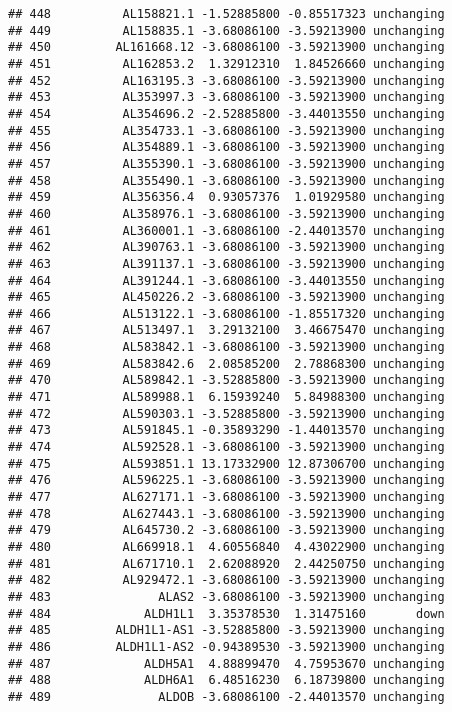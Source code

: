\documentclass[]{article}
\begin{document}
\begin{verbatim}
## 448          AL158821.1 -1.52885800 -0.85517323 unchanging
## 449          AL158835.1 -3.68086100 -3.59213900 unchanging
## 450         AL161668.12 -3.68086100 -3.59213900 unchanging
## 451          AL162853.2  1.32912310  1.84526660 unchanging
## 452          AL163195.3 -3.68086100 -3.59213900 unchanging
## 453          AL353997.3 -3.68086100 -3.59213900 unchanging
## 454          AL354696.2 -2.52885800 -3.44013550 unchanging
## 455          AL354733.1 -3.68086100 -3.59213900 unchanging
## 456          AL354889.1 -3.68086100 -3.59213900 unchanging
## 457          AL355390.1 -3.68086100 -3.59213900 unchanging
## 458          AL355490.1 -3.68086100 -3.59213900 unchanging
## 459          AL356356.4  0.93057376  1.01929580 unchanging
## 460          AL358976.1 -3.68086100 -3.59213900 unchanging
## 461          AL360001.1 -3.68086100 -2.44013570 unchanging
## 462          AL390763.1 -3.68086100 -3.59213900 unchanging
## 463          AL391137.1 -3.68086100 -3.59213900 unchanging
## 464          AL391244.1 -3.68086100 -3.44013550 unchanging
## 465          AL450226.2 -3.68086100 -3.59213900 unchanging
## 466          AL513122.1 -3.68086100 -1.85517320 unchanging
## 467          AL513497.1  3.29132100  3.46675470 unchanging
## 468          AL583842.1 -3.68086100 -3.59213900 unchanging
## 469          AL583842.6  2.08585200  2.78868300 unchanging
## 470          AL589842.1 -3.52885800 -3.59213900 unchanging
## 471          AL589988.1  6.15939240  5.84988300 unchanging
## 472          AL590303.1 -3.52885800 -3.59213900 unchanging
## 473          AL591845.1 -0.35893290 -1.44013570 unchanging
## 474          AL592528.1 -3.68086100 -3.59213900 unchanging
## 475          AL593851.1 13.17332900 12.87306700 unchanging
## 476          AL596225.1 -3.68086100 -3.59213900 unchanging
## 477          AL627171.1 -3.68086100 -3.59213900 unchanging
## 478          AL627443.1 -3.68086100 -3.59213900 unchanging
## 479          AL645730.2 -3.68086100 -3.59213900 unchanging
## 480          AL669918.1  4.60556840  4.43022900 unchanging
## 481          AL671710.1  2.62088920  2.44250750 unchanging
## 482          AL929472.1 -3.68086100 -3.59213900 unchanging
## 483               ALAS2 -3.68086100 -3.59213900 unchanging
## 484             ALDH1L1  3.35378530  1.31475160       down
## 485         ALDH1L1-AS1 -3.52885800 -3.59213900 unchanging
## 486         ALDH1L1-AS2 -0.94389530 -3.59213900 unchanging
## 487             ALDH5A1  4.88899470  4.75953670 unchanging
## 488             ALDH6A1  6.48516230  6.18739800 unchanging
## 489               ALDOB -3.68086100 -2.44013570 unchanging

\end{verbatim}
\end{document}
